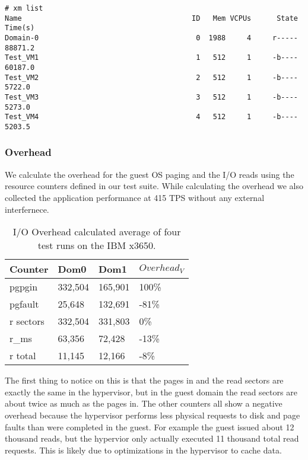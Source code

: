\begin{Verbatim}
# xm list
Name                                        ID   Mem VCPUs      State   Time(s)
Domain-0                                     0  1988     4     r-----  88871.2
Test_VM1                                     1   512     1     -b----  60187.0
Test_VM2                                     2   512     1     -b----   5722.0
Test_VM3                                     3   512     1     -b----   5273.0
Test_VM4                                     4   512     1     -b----   5203.5
\end{Verbatim}

\subsubsection{Overhead}
We calculate the overhead for the guest OS paging and the I/O reads using the resource counters defined in our test suite.  While calculating the overhead we also collected the application performance at 415 TPS without any external interfernece.

\begin{table}[h]
\begin{tabular}{ l l l p{5cm} }
  Counter & Dom0 & Dom1 & $Overhead_V$ \\
  \hline
	pgpgin    & 332,504 & 165,901 & 100\% \\
	pgfault   &  25,648 & 132,691 & -81\% \\
	r sectors & 332,504 & 331,803 &   0\% \\
	r\_ms     &  63,356 &  72,428 & -13\% \\
	r total   &  11,145 &  12,166 &  -8\% \\
  \hline
\end{tabular}
\caption{I/O Overhead calculated average of four test runs on the IBM x3650.}
\label{fig:OverheadSmall}
\end{table}

The first thing to notice on this is that the pages in and the read sectors are exactly  the same in the hypervisor, but in the guest domain the read sectors are about twice as much as the pages in.  The other counters all show a negative overhead because the hypervisor performs less physical requests to disk and page faults than were completed in the guest.  For example the guest issued about 12 thousand reads, but the hypervior only actually executed 11 thousand total read requests.  This is likely due to optimizations in the hypervisor to cache data.

